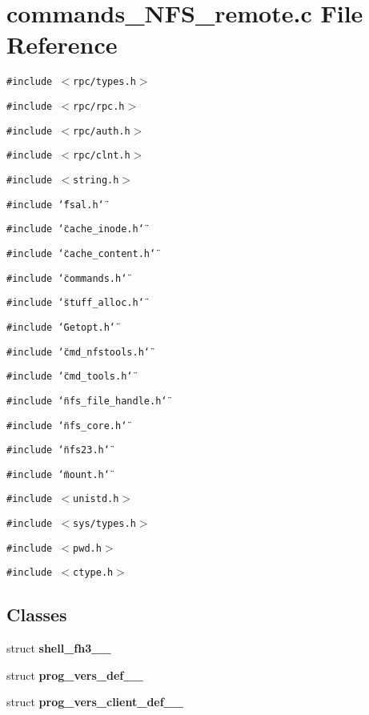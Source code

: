 \section{commands\_\-NFS\_\-remote.c File Reference}
\label{commands__NFS__remote_8c}
{\tt \#include $<$rpc/types.h$>$}\par
{\tt \#include $<$rpc/rpc.h$>$}\par
{\tt \#include $<$rpc/auth.h$>$}\par
{\tt \#include $<$rpc/clnt.h$>$}\par
{\tt \#include $<$string.h$>$}\par
{\tt \#include \char`\"{}fsal.h\char`\"{}}\par
{\tt \#include \char`\"{}cache\_\-inode.h\char`\"{}}\par
{\tt \#include \char`\"{}cache\_\-content.h\char`\"{}}\par
{\tt \#include \char`\"{}commands.h\char`\"{}}\par
{\tt \#include \char`\"{}stuff\_\-alloc.h\char`\"{}}\par
{\tt \#include \char`\"{}Getopt.h\char`\"{}}\par
{\tt \#include \char`\"{}cmd\_\-nfstools.h\char`\"{}}\par
{\tt \#include \char`\"{}cmd\_\-tools.h\char`\"{}}\par
{\tt \#include \char`\"{}nfs\_\-file\_\-handle.h\char`\"{}}\par
{\tt \#include \char`\"{}nfs\_\-core.h\char`\"{}}\par
{\tt \#include \char`\"{}nfs23.h\char`\"{}}\par
{\tt \#include \char`\"{}mount.h\char`\"{}}\par
{\tt \#include $<$unistd.h$>$}\par
{\tt \#include $<$sys/types.h$>$}\par
{\tt \#include $<$pwd.h$>$}\par
{\tt \#include $<$ctype.h$>$}\par
\subsection*{Classes}
\begin{CompactItemize}
\item 
struct {\bf shell\_\-fh3\_\-\_\-}
\item 
struct {\bf prog\_\-vers\_\-def\_\-\_\-}
\item 
struct {\bf prog\_\-vers\_\-client\_\-def\_\-\_\-}
\end{CompactItemize}
